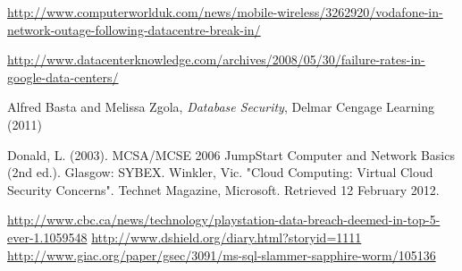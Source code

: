 \documentclass[11pt, twocolumn]{article}
\begin{document}
\begin{thebibliography}{}
  \url{http://www.computerworlduk.com/news/mobile-wireless/3262920/vodafone-in-network-outage-following-datacentre-break-in/}

  \url{http://www.datacenterknowledge.com/archives/2008/05/30/failure-rates-in-google-data-centers/}

  Alfred Basta and Melissa Zgola, {\it Database Security}, Delmar Cengage Learning (2011)

 Donald, L. (2003). MCSA/MCSE 2006 JumpStart Computer and Network Basics (2nd ed.). Glasgow: SYBEX.
 Winkler, Vic. "Cloud Computing: Virtual Cloud Security Concerns". Technet Magazine, Microsoft. Retrieved 12 February 2012.

 \url{http://www.cbc.ca/news/technology/playstation-data-breach-deemed-in-top-5-ever-1.1059548}
 \url{http://www.dshield.org/diary.html?storyid=1111}
 \url{http://www.giac.org/paper/gsec/3091/ms-sql-slammer-sapphire-worm/105136}

\end{thebibliography}
\end{document}
